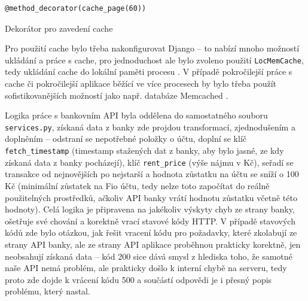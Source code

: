 \begin{listing}[ht]
	\begin{verbatim}
@method_decorator(cache_page(60))
	\end{verbatim}
	\caption{Dekorátor pro zavedení cache}\label{lst:cache}
\end{listing}

Pro použití cache bylo třeba nakonfigurovat Django -- to nabízí mnoho možností ukládání a práce s cache, pro jednoduchost ale bylo zvoleno použití \verb|LocMemCache|, tedy ukládání cache do lokální paměti procesu \cite{django-docs-cache}. V případě pokročilejší práce s cache či pokročilejší aplikace běžící ve více procesech by bylo třeba použít sofistikovanějších možností jako např. databáze Memcached \cite{django-docs-cache}.

Logika práce s bankovním API byla oddělena do samostatného souboru \verb|services.py|, získaná data z banky zde projdou transformací, zjednodušením a doplněním -- odstraní se nepotřebné položky o účtu, doplní se klíč \verb|fetch_timestamp| (timestamp stažených dat z banky, aby bylo jasné, ze kdy získaná data z banky pocházejí), klíč \verb|rent_price| (výše nájmu v Kč), seřadí se transakce od nejnovějších po nejstarší a hodnota zůstatku na účtu se sníží o 100 Kč (minimální zůstatek na Fio účtu, tedy nelze toto započítat do reálně použitelných prostředků, ačkoliv API banky vrátí hodnotu zůstatku včetně této hodnoty). Celá logika je připravena na jakékoliv výskyty chyb ze strany banky, ošetřuje své chování a korektně vrací stavové kódy HTTP. V případě stavových kódů zde bylo otázkou, jak řešit vracení kódu pro požadavky, které zkolabují ze strany API banky, ale ze strany API aplikace proběhnou prakticky korektně, jen neobsahují získaná data -- kód 200 sice dává smysl z hlediska toho, že samotné naše API nemá problém, ale prakticky došlo k interní chybě na serveru, tedy proto zde dojde k vrácení kódu 500 a součástí odpovědi je i přesný popis problému, který nastal.

